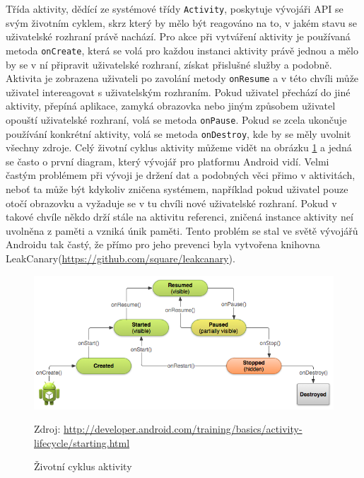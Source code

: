 \documentclass{article}
\begin{document}
 Třída aktivity, dědící ze systémové třídy \texttt{Activity},
 poskytuje vývojáři API se svým životním cyklem, skrz který by mělo být reagováno na to, v jakém
stavu se uživatelské rozhraní právě nachází. Pro akce při vytváření aktivity je používaná metoda
\texttt{onCreate}, která se volá pro každou instanci aktivity právě jednou a mělo by se v ní připravit
uživatelské rozhraní, získat přislušné služby a podobně. Aktivita je zobrazena uživateli po zavolání metody
\texttt{onResume} a v této chvíli může uživatel intereagovat s uživatelským rozhraním. Pokud uživatel
přechází do jiné aktivity, přepíná aplikace, zamyká obrazovka nebo jiným způsobem uživatel opouští uživatelské
rozhraní, volá se metoda \texttt{onPause}. Pokud se zcela ukončuje používání konkrétní aktivity,
volá se metoda \texttt{onDestroy}, kde by se měly uvolnit všechny zdroje.
Celý životní cyklus aktivity můžeme vidět na obrázku \ref{fig:activitylyfecycle} a jedná se
často o první diagram, který vývojář pro platformu Android vidí.
Velmi častým problémem při vývoji je držení dat a podobných věci přimo v aktivitách,
neboť ta může být kdykoliv zničena systémem, například
pokud uživatel pouze otočí obrazovku a vyžaduje se v tu chvíli nové uživatelské rozhraní. Pokud v takové chvíle
někdo drží stále na aktivitu referenci, zničená instance aktivity neí uvolněna z paměti a vzniká únik paměti.
Tento problém se stal ve světě vývojářů Androidu tak častý, že přímo pro jeho prevenci byla vytvořena knihovna
LeakCanary(\url{https://github.com/square/leakcanary}).
\begin{figure}[H]
        \centering
                \includegraphics[scale=0.4]{img/basic-lifecycle.png}
        \caption{Životní cyklus aktivity}
        \label{fig:activitylyfecycle}
        \centering Zdroj: \url{ http://developer.android.com/training/basics/activity-lifecycle/starting.html}
\end{figure}
\end{document}
